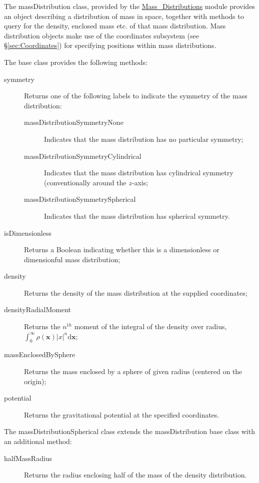 The {\normalfont \ttfamily massDistribution} class, provided by the \hyperlink{objects.mass_distributions.F90:mass_distributions}{\normalfont \ttfamily Mass\_Distributions} module provides an object describing a distribution of mass in space, together with methods to query for the density, enclosed mass etc. of that mass distribution. Mass distribution objects make use of the {\normalfont \ttfamily coordinates} subsystem (see \S\ref{sec:Coordinates}) for specifying positions within mass distributions.

The base class provides the following methods:
\begin{description}
\item [{\normalfont \ttfamily symmetry}] Returns one of the following labels to indicate the symmetry of the mass distribution:
 \begin{description}
  \item [{\normalfont \ttfamily massDistributionSymmetryNone}] Indicates that the mass distribution has no particular symmetry;
  \item [{\normalfont \ttfamily massDistributionSymmetryCylindrical}] Indicates that the mass distribution has cylindrical symmetry (conventionally around the $z$-axis;
  \item [{\normalfont \ttfamily massDistributionSymmetrySpherical}] Indicates that the mass distribution has spherical symmetry.
 \end{description}
\item [{\normalfont \ttfamily isDimensionless}] Returns a Boolean indicating whether this is a dimensionless or dimensionful mass distribution;
\item [{\normalfont \ttfamily density}] Returns the density of the mass distribution at the supplied {\normalfont \ttfamily coordinates};
\item [{\normalfont \ttfamily densityRadialMoment}] Returns the $n^{\mathrm th}$ moment of the integral of the density over radius, $\int_0^\infty \rho({\mathbf x}) |x|^n {\mathrm d} {\mathbf x}$; 
\item [{\normalfont \ttfamily massEnclosedBySphere}] Returns the mass enclosed by a sphere of given {\normalfont \ttfamily radius} (centered on the origin);
\item [{\normalfont \ttfamily potential}] Returns the gravitational potential at the specified {\normalfont \ttfamily coordinates}.
\end{description}

The {\normalfont \ttfamily massDistributionSpherical} class extends the {\normalfont \ttfamily massDistribution} base class with an additional method:
\begin{description}
 \item [{\normalfont \ttfamily halfMassRadius}] Returns the radius enclosing half of the mass of the density distribution.
\end{description}

